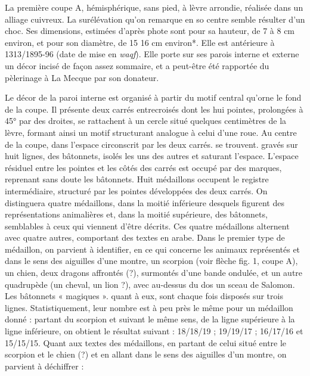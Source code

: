 La première coupe A, hémisphérique, sans pied, à lèvre arrondie, réalisée dans un alliage cuivreux. La surélévation qu'on remarque en so centre semble résulter d'un choc. Ses dimensions, estimées d'après phote sont pour sa hauteur, de 7 à 8 cm environ, et pour son diamètre, de 15 16 cm environ*. Elle est antérieure à 1313/1895-96 (date de mise en \textit{waqf}). Elle porte sur ses parois interne et externe un décor incisé de façon assez sommaire, et a peut-être été rapportée du pèlerinage à La Mecque par son donateur.


Le décor de la paroi interne est organisé à partir du motif central qu'orne le fond de la coupe. Il présente deux carrés entrecroisés dont les hui pointes, prolongées à 45° par des droites, se rattachent à un cercle situé quelques centimètres de la lèvre, formant ainsi un motif structurant analogue à celui d'une roue. Au centre de la coupe, dans l'espace circonscrit par les deux carrés. se trouvent. gravés sur huit lignes, des bâtonnets, isolés les uns des autres et saturant l'espace. L'espace résiduel entre les pointes et les côtés des carrés est occupé par des marques, reprenant sans doute les bâtonnets. Huit médaillons occupent le registre intermédiaire, structuré par les pointes développées des deux carrés. On distinguera quatre médaillons, dans la moitié inférieure desquels figurent des représentations animalières et, dans la moitié supérieure, des bâtonnets, semblables à ceux qui viennent d'être décrits. Ces quatre médaillons alternent avec quatre autres, comportant des textes en arabe. Dans le premier type de médaillon, on parvient à identifier, en ce qui concerne les animaux représentés et dans le sens des aiguilles d'une montre, un scorpion (voir flèche fig. 1, coupe A), un chien, deux dragons affrontés (?), surmontés d'une bande ondulée, et un autre quadrupède (un cheval, un lion ?), avec au-dessus du dos un sceau de Salomon. Les bâtonnets « magiques ». quant à eux, sont chaque fois disposés sur trois lignes. Statistiquement, leur nombre est à peu près le même pour un médaillon donné : partant du scorpion et suivant le même sens, de la ligne supérieure à la ligne inférieure, on obtient le résultat suivant : 18/18/19 ; 19/19/17 ; 16/17/16 et 15/15/15. Quant aux textes des médaillons, en partant de celui situé entre le scorpion et le chien (?) et en allant dans le sens des aiguilles d'un montre, on parvient à déchiffrer :
